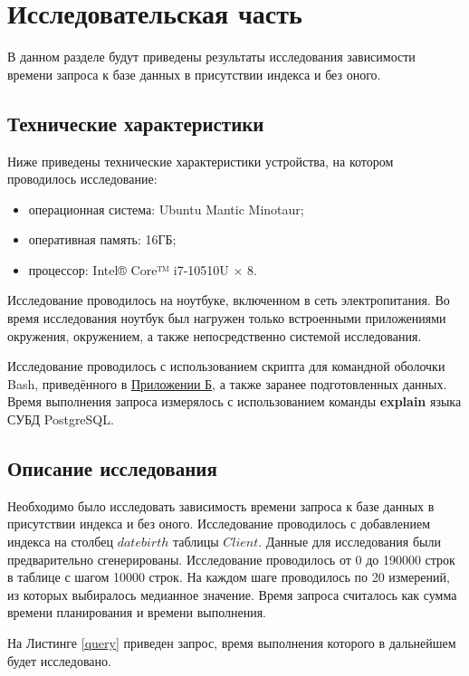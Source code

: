 \chapter{Исследовательская часть}

В данном разделе будут приведены результаты исследования зависимости времени запроса к базе данных в присутствии индекса и без оного.

\section{Технические характеристики}
Ниже приведены технические характеристики устройства, на котором проводилось исследование:

\begin{itemize}
	\item операционная система: Ubuntu Mantic Minotaur;
	\item оперативная память: 16ГБ;
	\item процессор: Intel® Core™ i7-10510U × 8.
\end{itemize}

Исследование проводилось на ноутбуке, включенном в сеть электропитания. 
Во время исследования ноутбук был нагружен только встроенными приложениями окружения, окружением, а также непосредственно системой исследования. 

Исследование проводилось с использованием скрипта для командной оболочки Bash\cite{bashman}, приведённого в \hyperref[chp:Appendix2]{Приложении Б}, а также заранее подготовленных данных. 
Время выполнения запроса измерялось с использованием команды \textbf{explain} языка СУБД PostgreSQL\cite{timeman}. 

\section{Описание исследования}

Необходимо было исследовать зависимость времени запроса к базе данных в присутствии индекса и без оного. 
Исследование проводилось с добавлением индекса на столбец $datebirth$ таблицы $Client$. 
Данные для исследования были предварительно сгенерированы. 
Исследование проводилось от 0 до 190000 строк в таблице с шагом 10000 строк. 
На каждом шаге проводилось по 20 измерений, из которых выбиралось медианное значение. 
Время запроса считалось как сумма времени планирования и времени выполнения.

На Листинге \ref{query} приведен запрос, время выполнения которого в дальнейшем будет исследовано.

